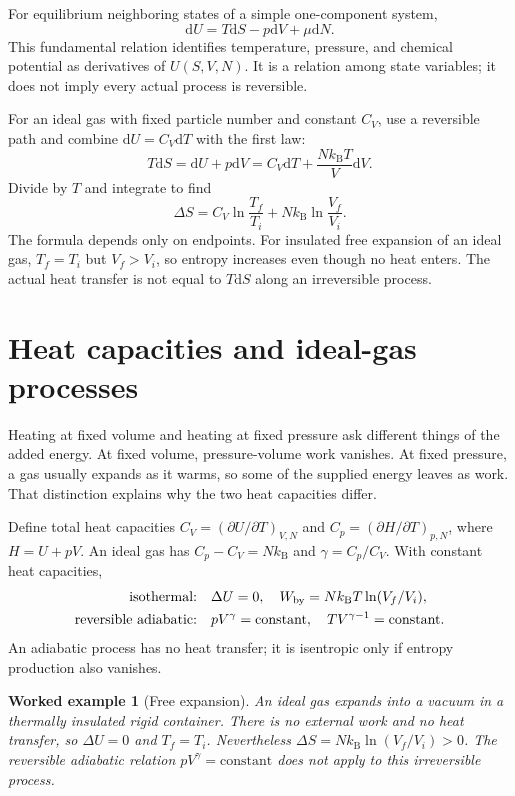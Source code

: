 \documentclass[11pt,oneside]{book}
\newcommand{\dd}{\mathrm{d}}
\newcommand{\kb}{k_{\mathrm B}}
\theoremstyle{reviewstyle}
\newtheorem{example}{Worked example}[chapter]
\begin{document}
For equilibrium neighboring states of a simple one-component system,
\begin{equation}\boxed{\dd U=T\dd S-p\dd V+\mu\dd N.}\end{equation}
This fundamental relation identifies temperature, pressure, and chemical potential as derivatives of $U(S,V,N)$. It is a relation among state variables; it does not imply every actual process is reversible.

For an ideal gas with fixed particle number and constant $C_V$, use a reversible path and combine $\dd U=C_V\dd T$ with the first law:
\begin{equation}
T\dd S=\dd U+p\dd V
=C_V\dd T+\frac{N\kb T}{V}\dd V.
\end{equation}
Divide by $T$ and integrate to find
\begin{equation}
\Delta S=C_V\ln\frac{T_f}{T_i}+N\kb\ln\frac{V_f}{V_i}.
\end{equation}
The formula depends only on endpoints. For insulated free expansion of an ideal gas, $T_f=T_i$ but $V_f>V_i$, so entropy increases even though no heat enters. The actual heat transfer is not equal to $T\dd S$ along an irreversible process.

\section{Heat capacities and ideal-gas processes}
Heating at fixed volume and heating at fixed pressure ask different things of the added energy. At fixed volume, pressure-volume work vanishes. At fixed pressure, a gas usually expands as it warms, so some of the supplied energy leaves as work. That distinction explains why the two heat capacities differ.

Define total heat capacities $C_V=(\partial U/\partial T)_{V,N}$ and $C_p=(\partial H/\partial T)_{p,N}$, where $H=U+pV$. An ideal gas has $C_p-C_V=N\kb$ and $\gamma=C_p/C_V$. With constant heat capacities,
\begin{align}
\text{isothermal:}\quad &\Delta U=0,\quad W_{\rm by}=N\kb T\ln(V_f/V_i),\\
\text{reversible adiabatic:}\quad &pV^\gamma=\text{constant},\quad TV^{\gamma-1}=\text{constant}.
\end{align}
An adiabatic process has no heat transfer; it is isentropic only if entropy production also vanishes.
\begin{example}[Free expansion]
An ideal gas expands into a vacuum in a thermally insulated rigid container. There is no external work and no heat transfer, so $\Delta U=0$ and $T_f=T_i$. Nevertheless $\Delta S=N\kb\ln(V_f/V_i)>0$. The reversible adiabatic relation $pV^\gamma=\text{constant}$ does not apply to this irreversible process.
\end{example}
\end{document}
